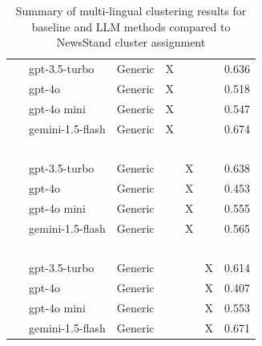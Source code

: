 \begin{table}[ht!]
\begin{tabular}{l|l|cccc|r}
        ~                     & gpt-3.5-turbo     & Generic               & X              & ~                  & ~                    & 0.636 \\
        ~                     & gpt-4o            & Generic               & X              & ~                  & ~                    & 0.518 \\
        ~                     & gpt-4o mini       & Generic               & X              & ~                  & ~                    & 0.547 \\
        ~                     & gemini-1.5-flash  & Generic               & X              & ~                  & ~                    & 0.674 \\
        ~                     & ~                 & ~                      & ~              & ~                  & ~                    & ~   \\
        ~                     & gpt-3.5-turbo     & Generic               & ~              & X                  & ~                    & 0.638 \\
        ~                     & gpt-4o            & Generic               & ~              & X                  & ~                    & 0.453 \\
        ~                     & gpt-4o mini       & Generic               & ~              & X                  & ~                    & 0.555 \\
        ~                     & gemini-1.5-flash  & Generic               & ~              & X                  & ~                    & 0.565 \\
        ~                     & ~                 & ~                      & ~              & ~                  & ~                    & ~   \\
        ~                     & gpt-3.5-turbo     & Generic               & ~              & ~                  & X                    & 0.614 \\
        ~                     & gpt-4o            & Generic               & ~              & ~                  & X                    & 0.407 \\
        ~                     & gpt-4o mini       & Generic               & ~              & ~                  & X                    & 0.553 \\
        ~                     & gemini-1.5-flash  & Generic               & ~              & ~                  & X                    & 0.671 \\

    \end{tabular}
    \caption{Summary of multi-lingual clustering results for baseline and LLM methods compared to NewsStand cluster assignment}
    \label{tab:single-lang-results}
\end{table}




